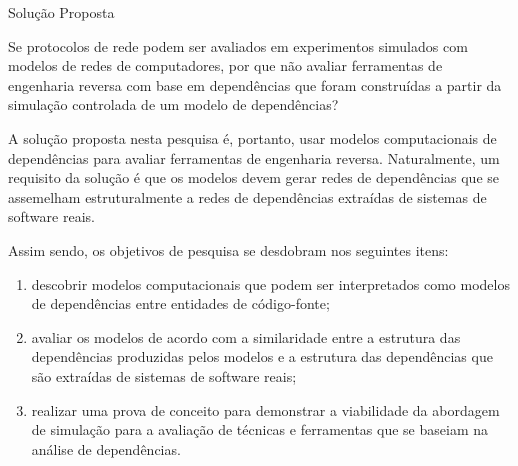 \begin{section}{Solução Proposta}
	
	
	Se protocolos de rede podem ser avaliados em experimentos simulados com modelos de redes de computadores, por que não avaliar ferramentas de engenharia reversa com base em dependências que foram construídas a partir da simulação controlada de um modelo de dependências? 
	
	A solução proposta nesta pesquisa é, portanto, usar modelos computacionais de dependências para avaliar ferramentas de engenharia reversa. Naturalmente, um requisito da solução é que os modelos devem gerar redes de dependências que se assemelham estruturalmente a redes de dependências extraídas de sistemas de software reais.

	Assim sendo, os objetivos de pesquisa se desdobram nos seguintes itens:
	\begin{enumerate}
		\item descobrir modelos computacionais que podem ser interpretados como modelos de dependências entre entidades de código-fonte;
		\item avaliar os modelos de acordo com a similaridade entre a estrutura das dependências produzidas pelos modelos e a estrutura das dependências que são extraídas de sistemas de software reais;
		\item realizar uma prova de conceito para demonstrar a viabilidade da abordagem de simulação para a avaliação de técnicas e ferramentas que se baseiam na análise de dependências.
	\end{enumerate}
\end{section}

% 	
% 	

